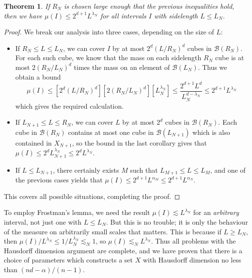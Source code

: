 \documentclass{article}
\theoremstyle{plain}
\theoremstyle{plain}
\newtheorem{theorem}{Theorem}
\begin{document}
\begin{theorem}
	If $R_N$ is chosen large enough that the previous inequalities hold, then we have $\mu(I) \leq 2^{d+1} L^{\lambda_N}$ for all intervals $I$ with sidelength $L \leq L_N$.
\end{theorem}
\begin{proof}
	We break our analysis into three cases, depending on the size of $L$:
	\begin{itemize}
		\item If $R_N \leq L \leq L_N$, we can cover $I$ by at most $2^d(L/R_N)^d$ cubes in $\mathcal{B}(R_N)$. For each such cube, we know that the mass on each sidelength $R_N$ cube is at most $2(R_N/L_N)^d$ times the mass on an element of $\mathcal{B}(L_N)$. Thus we obtain a bound
		\[ \mu(I) \leq [2^d(L/R_N)^d] [2(R_N/L_N)^d] [L_N^{\lambda_N}] \leq \frac{2^{d+1} L^d}{L_N^{d - \lambda_N}} \leq 2^{d+1} L^{\lambda_N} \]
		which gives the required calculation.

		\item If $L_{N+1} \leq L \leq R_N$, we can cover $L$ by at most $2^d$ cubes in $\mathcal{B}(R_N)$. Each cube in $\mathcal{B}(R_N)$ contains at most one cube in $\mathcal{B}(L_{N+1})$ which is also contained in $X_{N+1}$, so the bound in the last corollary gives that $\mu(I) \leq 2^d L_{N+1}^{\lambda_N} \leq 2^d L^{\lambda_N}$.

		\item If $L \leq L_{N+1}$, there certainly exists $M$ such that $L_{M+1} \leq L \leq L_M$, and one of the previous cases yields that $\mu(I) \leq 2^{d+1} L^{\alpha_M} \leq 2^{d+1} L^{\alpha_N}$.
	\end{itemize}
	This covers all possible situations, completing the proof.
\end{proof}

To employ Frostman's lemma, we need the result $\mu(I) \lesssim L^{\lambda_N}$ for an {\it arbitrary} interval, not just one with $L \leq L_N$. But this is no trouble; it is only the behaviour of the measure on arbitrarily small scales that matters. This is because if $L \geq L_N$, then $\mu(I)/L^{\lambda_N} \leq 1/L_N^{\lambda_N} \lesssim_N 1$, so $\mu(I) \lesssim_N L^{\lambda_N}$. Thus all problems with the Hausdorff dimension argument are complete, and we have proven that there is a choice of parameters which constructs a set $X$ with Hausdorff dimension no less than $(nd - \alpha)/(n-1)$.

\end{document}
